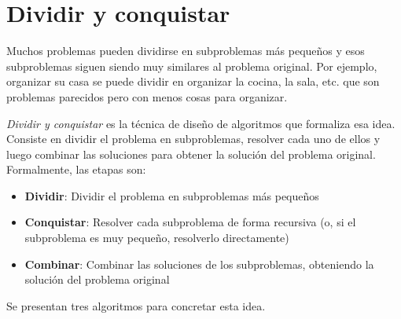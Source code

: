 \section{Dividir y conquistar}

Muchos problemas pueden dividirse en subproblemas más pequeños y esos subproblemas siguen siendo muy similares al problema original. Por ejemplo, organizar su casa se puede dividir en organizar la cocina, la sala, etc. que son problemas parecidos pero con menos cosas para organizar.

\emph{Dividir y conquistar} es la técnica de diseño de algoritmos que formaliza esa idea. Consiste en dividir el problema en subproblemas, resolver cada uno de ellos y luego combinar las soluciones para obtener la solución del problema original. Formalmente, las etapas son:
\begin{itemize}
    \item \textbf{Dividir}: Dividir el problema en subproblemas más pequeños
    \item \textbf{Conquistar}: Resolver cada subproblema de forma recursiva (o, si el subproblema es muy pequeño, resolverlo directamente)
    \item \textbf{Combinar}: Combinar las soluciones de los subproblemas, obteniendo la solución del problema original
\end{itemize}

Se presentan tres algoritmos para concretar esta idea.






